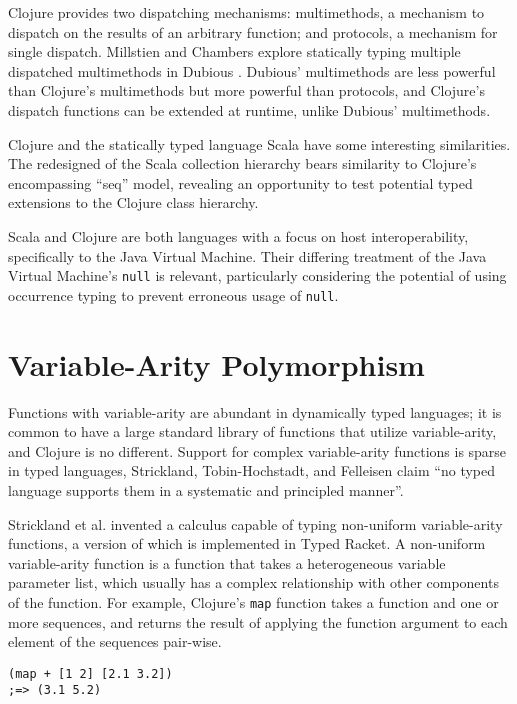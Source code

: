 Clojure provides two dispatching mechanisms: multimethods, a mechanism to dispatch on the
results of an arbitrary function; and protocols, a mechanism for single dispatch.
Millstien and Chambers explore statically typing multiple dispatched multimethods in Dubious \cite{MS02}.
Dubious' multimethods are less powerful than Clojure's multimethods but more powerful than protocols,
and Clojure's dispatch functions can be extended at runtime, unlike Dubious' multimethods.

Clojure and the statically typed language Scala \cite{OCD+} 
have some interesting similarities. The redesigned 
of the Scala collection hierarchy
\cite{OS10}
bears similarity to Clojure's encompassing ``seq''
model, revealing an opportunity to test potential typed extensions to the Clojure 
class hierarchy. 

Scala and Clojure are both languages with a focus on host interoperability, specifically
to the Java Virtual Machine. Their differing treatment of the Java Virtual Machine's \lstinline|null| is
relevant, particularly considering the potential of using occurrence typing \cite{TF10}
to prevent erroneous usage of \lstinline|null|.

\section{Variable-Arity Polymorphism}

Functions with variable-arity are abundant in dynamically typed languages;
it is common to have a large standard library of functions that utilize
variable-arity, and Clojure is no different. 
Support for complex variable-arity functions is sparse in typed languages,
Strickland, Tobin-Hochstadt, and Felleisen claim \cite{STF09}
``no typed language supports them in a systematic and principled manner''.

Strickland et al. invented \cite{STF09} 
a calculus capable of typing non-uniform variable-arity functions, a version of which
is implemented in Typed Racket. A non-uniform variable-arity function is a function that
takes a heterogeneous variable parameter list, which usually has a complex relationship 
with other components of the function.
For example, Clojure's \lstinline|map| function takes a function and one or more sequences,
and returns the result of applying the function argument to each element of the sequences pair-wise.

\begin{lstlisting}[caption=An application of the non-uniform variable-arity function \lstinline|map|, label=lst:map]
(map + [1 2] [2.1 3.2]) 
;=> (3.1 5.2)
\end{lstlisting}

